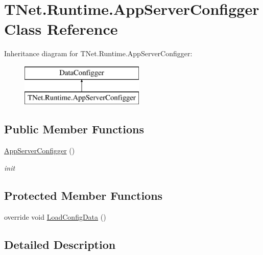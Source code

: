 \hypertarget{class_t_net_1_1_runtime_1_1_app_server_configger}{}\section{T\+Net.\+Runtime.\+App\+Server\+Configger Class Reference}
\label{class_t_net_1_1_runtime_1_1_app_server_configger}


 


Inheritance diagram for T\+Net.\+Runtime.\+App\+Server\+Configger\+:\begin{figure}[H]
\begin{center}
\leavevmode
\includegraphics[height=2.000000cm]{class_t_net_1_1_runtime_1_1_app_server_configger}
\end{center}
\end{figure}
\subsection*{Public Member Functions}
\begin{DoxyCompactItemize}
\item 
\mbox{\hyperlink{class_t_net_1_1_runtime_1_1_app_server_configger_ac59e67b87b742936c38be94679f05f41}{App\+Server\+Configger}} ()
\begin{DoxyCompactList}\small\item\em init \end{DoxyCompactList}\end{DoxyCompactItemize}
\subsection*{Protected Member Functions}
\begin{DoxyCompactItemize}
\item 
override void \mbox{\hyperlink{class_t_net_1_1_runtime_1_1_app_server_configger_a114e96b595743bad0978b22076917bcc}{Load\+Config\+Data}} ()
\end{DoxyCompactItemize}


\subsection{Detailed Description}




